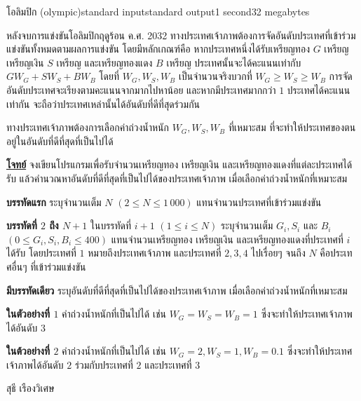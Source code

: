 \documentclass[11pt,a4paper]{article}
\begin{document}
\begin{problem}{โอลิมปิก (olympic)}{standard input}{standard output}{1 second}{32 megabytes}

หลังจบการแข่งขันโอลิมปิกฤดูร้อน ค.ศ. 2032 ทางประเทศเจ้าภาพต้องการจัดอันดับประเทศที่เข้าร่วมแข่งขันทั้งหมดตามผลการแข่งขัน โดยมีหลักเกณฑ์คือ หากประเทศหนึ่งได้รับเหรียญทอง $G$ เหรียญ เหรียญเงิน $S$ เหรียญ และเหรียญทองแดง $B$ เหรียญ ประเทศนั้นจะได้คะแนนเท่ากับ $GW_G + SW_S + BW_B$ โดยที่ $W_G, W_S, W_B$ เป็นจำนวนจริงบวกที่ $W_G ≥ W_S ≥ W_B$ การจัดอันดับประเทศจะเรียงตามคะแนนจากมากไปหาน้อย และหากมีประเทศมากกว่า $1$ ประเทศได้คะแนนเท่ากัน จะถือว่าประเทศเหล่านั้นได้อันดับที่ดีที่สุดร่วมกัน

ทางประเทศเจ้าภาพต้องการเลือกค่าถ่วงน้ำหนัก $W_G, W_S, W_B$ ที่เหมาะสม ที่จะทำให้ประเทศของตนอยู่ในอันดับที่ดีที่สุดที่เป็นไปได้

\bigskip
\underline{\textbf{โจทย์}}  จงเขียนโปรแกรมเพื่อรับจำนวนเหรียญทอง เหรียญเงิน และเหรียญทองแดงที่แต่ละประเทศได้รับ แล้วคำนวณหาอันดับที่ดีที่สุดที่เป็นไปได้ของประเทศเจ้าภาพ เมื่อเลือกค่าถ่วงน้ำหนักที่เหมาะสม


\InputFile

\textbf{บรรทัดแรก} ระบุจำนวนเต็ม $N$ $(2 \leq N \leq 1\,000)$ แทนจำนวนประเทศที่เข้าร่วมแข่งขัน

\textbf{บรรทัดที่ $2$ ถึง $N+1$} ในบรรทัดที่ $i+1$ $(1 \leq i \leq N)$ ระบุจำนวนเต็ม $G_i, S_i$ และ $B_i$ $(0 \leq G_i, S_i, B_i \leq 400)$ แทนจำนวนเหรียญทอง เหรียญเงิน และเหรียญทองแดงที่ประเทศที่ $i$ ได้รับ โดยประเทศที่ $1$ หมายถึงประเทศเจ้าภาพ และประเทศที่ $2, 3, 4$ ไปเรื่อยๆ จนถึง $N$ คือประเทศอื่นๆ ที่เข้าร่วมแข่งขัน


\OutputFile

\textbf{มีบรรทัดเดียว} ระบุอันดับที่ดีที่สุดที่เป็นไปได้ของประเทศเจ้าภาพ เมื่อเลือกค่าถ่วงน้ำหนักที่เหมาะสม

\Examples

\begin{example}
%
%
\end{example}

\Note 

\textbf{ในตัวอย่างที่ $1$} ค่าถ่วงน้ำหนักที่เป็นไปได้ เช่น $W_G = W_S = W_B = 1$ ซึ่งจะทำให้ประเทศเจ้าภาพได้อันดับ $3$ 

\textbf{ในต้วอย่างที่ $2$} ค่าถ่วงน้ำหนักที่เป็นไปได้ เช่น $W_G = 2, W_S = 1, W_B = 0.1$ ซึ่งจะทำให้ประเทศเจ้าภาพได้อันดับ $2$ ร่วมกับประเทศที่ $2$ และประเทศที่ $3$

\Source

สุธี เรืองวิเศษ

\end{problem}
\end{document}
